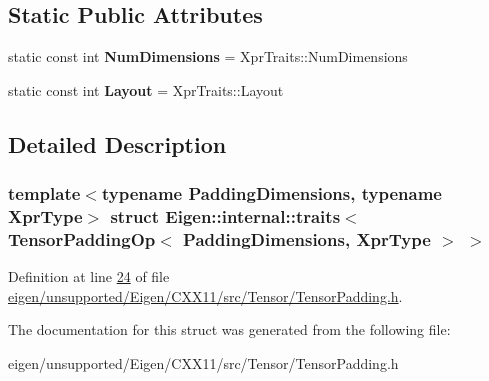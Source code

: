 \subsection*{Static Public Attributes}
\begin{DoxyCompactItemize}
\item 
\mbox{\label{struct_eigen_1_1internal_1_1traits_3_01_tensor_padding_op_3_01_padding_dimensions_00_01_xpr_type_01_4_01_4_ab93f075108b86075afa56f2fa626031e}} 
static const int {\bfseries Num\+Dimensions} = Xpr\+Traits\+::\+Num\+Dimensions
\item 
\mbox{\label{struct_eigen_1_1internal_1_1traits_3_01_tensor_padding_op_3_01_padding_dimensions_00_01_xpr_type_01_4_01_4_a41624d8bfe0190a2221f075224da6ced}} 
static const int {\bfseries Layout} = Xpr\+Traits\+::\+Layout
\end{DoxyCompactItemize}


\subsection{Detailed Description}
\subsubsection*{template$<$typename Padding\+Dimensions, typename Xpr\+Type$>$\newline
struct Eigen\+::internal\+::traits$<$ Tensor\+Padding\+Op$<$ Padding\+Dimensions, Xpr\+Type $>$ $>$}



Definition at line \hyperlink{eigen_2unsupported_2_eigen_2_c_x_x11_2src_2_tensor_2_tensor_padding_8h_source_l00024}{24} of file \hyperlink{eigen_2unsupported_2_eigen_2_c_x_x11_2src_2_tensor_2_tensor_padding_8h_source}{eigen/unsupported/\+Eigen/\+C\+X\+X11/src/\+Tensor/\+Tensor\+Padding.\+h}.



The documentation for this struct was generated from the following file\+:\begin{DoxyCompactItemize}
\item 
eigen/unsupported/\+Eigen/\+C\+X\+X11/src/\+Tensor/\+Tensor\+Padding.\+h\end{DoxyCompactItemize}

